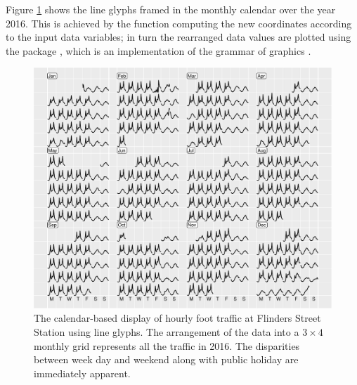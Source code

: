 \documentclass[article]{jss}
\theoremstyle{definition}
\theoremstyle{definition}
\theoremstyle{remark}
\begin{document}
\label{sec:algorithm}

Figure \ref{fig:flinders-2016} shows the line glyphs framed in the
monthly calendar over the year 2016. This is achieved by the
 function computing the new coordinates according
to the input data variables; in turn the rearranged data values are
plotted using the  package \citep{R-ggplot2}, which is an
implementation of the grammar of graphics
\citep{wilkinson2006grammar, wickham2010layered}.

\begin{CodeChunk}
\begin{figure}

{\centering \includegraphics[width=\textwidth]{figure/flinders-2016-1} 

}

\caption[The calendar-based display of hourly foot
traffic at Flinders Street Station using line glyphs. The arrangement of
the data into a \(3 \times 4\) monthly grid represents all the traffic
in 2016. The disparities between week day and weekend along with public
holiday are immediately apparent.]{The calendar-based display of hourly foot
traffic at Flinders Street Station using line glyphs. The arrangement of
the data into a \(3 \times 4\) monthly grid represents all the traffic
in 2016. The disparities between week day and weekend along with public
holiday are immediately apparent.}\label{fig:flinders-2016}
\end{figure}
\end{CodeChunk}
\end{document}
